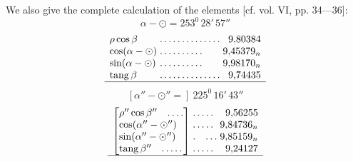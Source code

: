 We also give the complete calculation of the elements [cf. vol. VI, pp. 34—36]:
\[
\alpha-\odot=253^{0}\,28'\,57''
\]
\[
\begin{array}{l@{\;}l@{\;}r}
\rho\cos\beta&\mathord{.}\,\mathord{.}\,\mathord{.}\,\mathord{.}\,\mathord{.}\,\mathord{.}\,\mathord{.}\,\mathord{.}\,\mathord{.}\,\mathord{.}\,\mathord{.}\,\mathord{.}\,\mathord{.}\,\mathord{.}&9{,}80384\\
\cos(\alpha-\odot)&\mathord{.}\,\mathord{.}\,\mathord{.}\,\mathord{.}\,\mathord{.}\,\mathord{.}\,\mathord{.}\,\mathord{.}\,\mathord{.}\,\mathord{.}&9{,}45379_n\\
\sin(\alpha-\odot)&\mathord{.}\,\mathord{.}\,\mathord{.}\,\mathord{.}\,\mathord{.}\,\mathord{.}\,\mathord{.}\,\mathord{.}\,\mathord{.}\,\mathord{.}&9{,}98170_n\\
\operatorname{tang}\beta&\mathord{.}\,\mathord{.}\,\mathord{.}\,\mathord{.}\,\mathord{.}\,\mathord{.}\,\mathord{.}\,\mathord{.}\,\mathord{.}\,\mathord{.}\,\mathord{.}\,\mathord{.}\,\mathord{.}\,\mathord{.}&9{,}74435\\\hline
\end{array}
\]
\[
[\alpha''-\odot''=]\ 225^{0}\,16'\,43''
\]
\[
\begin{array}{l@{\;}l@{\;}r}
\left[\begin{array}{@{}l@{}}\rho''\cos\beta''\quad\mathord{.}\,\mathord{.}\,\mathord{.}\,\mathord{.}\\\cos(\alpha''-\odot'')\\\sin(\alpha''-\odot'')\\\operatorname{tang}\beta''\quad\mathord{.}\,\mathord{.}\,\mathord{.}\,\mathord{.}\,\mathord{.}\end{array}\right]&
\begin{array}{@{}l@{}}\mathord{.}\,\mathord{.}\,\mathord{.}\,\mathord{.}\,\mathord{.}\\\mathord{.}\,\mathord{.}\,\mathord{.}\,\mathord{.}\,\mathord{.}\\\mathord{.}\quad\mathord{.}\,\mathord{.}\,\mathord{.}\\\mathord{.}\,\mathord{.}\,\mathord{.}\,\mathord{.}\,\mathord{.}\end{array}&
\begin{array}{@{}r@{}}9{,}56255\\9{,}84736_n\\9{,}85159_n\\9{,}24127\end{array}\\\hline
\end{array}
\]

